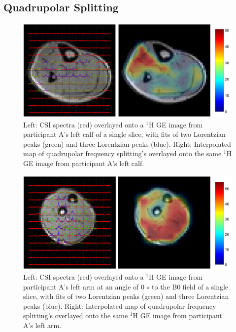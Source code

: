 \documentclass[class=article, crop=false]{standalone}
\begin{document}
\subsection{Quadrupolar Splitting}

\begin{figure}
    \centering
    \includegraphics[width=1\textwidth]{Figures/Quad/Calf_A.png}
    \caption{Left: CSI spectra (red) overlayed onto a $^1$H GE image from participant A's left calf of a single slice, with fits of two Lorentzian peaks (green) and three Lorentzian peaks (blue). Right: Interpolated map of quadrupolar frequency splitting's overlayed onto the same $^1$H GE image from participant A's left calf. }
    \label{fig:D2O:Calf_A}
\end{figure}

\begin{figure}
    \centering
    \includegraphics[width=1\textwidth]{Figures/Quad/Arm_A.png}
    \caption{Left: CSI spectra (red) overlayed onto a $^1$H GE image from participant A's left arm at an angle of 0 ${\circ}$ to the B0 field of a single slice, with fits of two Lorentzian peaks (green) and three Lorentzian peaks (blue). Right: Interpolated map of quadrupolar frequency splitting's overlayed onto the same $^1$H GE image from participant A's left arm. }
    \label{fig:D2O:Arm_A}
\end{figure}
\end{document}
